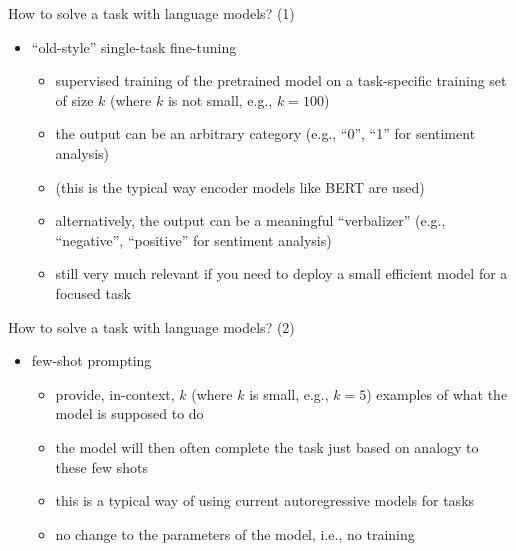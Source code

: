 \begin{frame}{How to solve a task with language models? (1)}

\vfill

\begin{itemize}
    \item ``old-style'' single-task fine-tuning 
        \begin{itemize}
            \item supervised training
of the pretrained model
on a task-specific
        training set of size $k$ (where $k$ is not small,
        e.g., $k=100$)
        \item the output can be an arbitrary category (e.g.,
        ``0'', ``1'' for sentiment analysis)
        \item (this is the typical way encoder models like
        BERT are used)
            \item alternatively, the output can be a
        meaningful ``verbalizer'' (e.g., ``negative'',
        ``positive'' for sentiment analysis)
        \item still very much relevant if you need to deploy
        a small efficient model for a focused task
        \end{itemize}
\end{itemize}

\vfill

\end{frame}


\begin{frame}{How to solve a task with language models? (2)}

\vfill

\begin{itemize}
    \item few-shot prompting
        \begin{itemize}
            \item provide, in-context,  $k$ (where $k$ is small, e.g., $k=5$) examples of what the model is
supposed to do
        \item the model will then often complete the task
        just based on analogy to these few shots
        \item this is a typical way of using current
        autoregressive models for tasks
\item no change to the parameters of the model, i.e., no training
\end{itemize}
\end{itemize}

\vfill

\end{frame}

